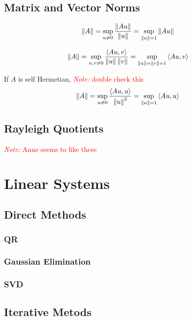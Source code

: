 \documentclass[12pt]{article}
\newcommand{\note}[1]{\textcolor{red}{\textit{Note:} #1}}
\begin{document}
\subsection{Matrix and Vector Norms}

\begin{align*}
    \left\lVert A\right\rVert = \sup_{u\neq 0} \frac{\left\lVert Au\right\rVert}{\left\lVert u\right\rVert} = \sup_{\left\lVert u\right\rVert=1} \left\lVert Au\right\rVert
\end{align*}

\begin{align*}
    \left\lVert A\right\rVert = \sup_{u,v\neq 0} \frac{\left\langle Au,v \right\rangle}{\left\lVert u\right\rVert\left\lVert v\right\rVert} = \sup_{\left\lVert u\right\rVert=\left\lVert v\right\rVert=1} \left\langle Au,v \right\rangle
\end{align*}
 
If \( A \) is self Hermetian,
\note{double check this}
\begin{align*}
    \left\lVert A\right\rVert = \sup_{u\neq 0} \frac{\left\langle Au,u \right\rangle}{\left\lVert u\right\rVert^2} = \sup_{\left\lVert u\right\rVert=1} \left\langle Au,u \right\rangle
\end{align*}

\subsection{Rayleigh Quotients}
\note{Anne seems to like these}



\section{Linear Systems}

\subsection{Direct Methods}
\subsubsection{QR}

\subsubsection{Gaussian Elimination}

\subsubsection{SVD}



\subsection{Iterative Metods}
\end{document}
